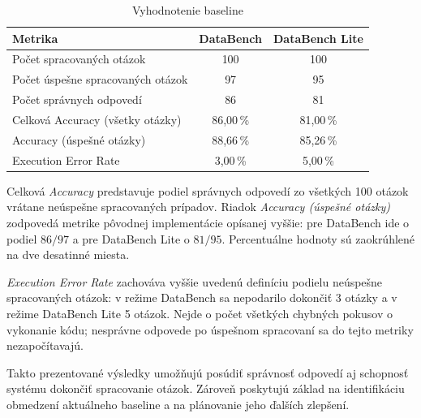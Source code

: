 \begin{table}[htbp]
    \centering
    \caption{Vyhodnotenie baseline}
    \label{tab:baseline-metriky}
    \begin{tabular}{|l|c|c|}
        \hline
        \textbf{Metrika} &
        \textbf{DataBench} &
        \textbf{DataBench Lite} \\
        \hline
        Počet spracovaných otázok & 100 & 100 \\
        \hline
        Počet úspešne spracovaných otázok & 97 & 95 \\
        \hline
        Počet správnych odpovedí & 86 & 81 \\
        \hline
        Celková Accuracy (všetky otázky) & 86,00\,\% & 81,00\,\% \\
        \hline
        Accuracy (úspešné otázky) & 88,66\,\% & 85,26\,\% \\
        \hline
        Execution Error Rate & 3,00\,\% & 5,00\,\% \\
        \hline
    \end{tabular}
\end{table}

Celková \textit{Accuracy} predstavuje podiel správnych odpovedí zo všetkých 100 otázok vrátane neúspešne spracovaných prípadov. Riadok \textit{Accuracy (úspešné otázky)} zodpovedá metrike pôvodnej implementácie opísanej vyššie: pre DataBench ide o podiel $86/97$ a pre DataBench Lite o $81/95$. Percentuálne hodnoty sú zaokrúhlené na dve desatinné miesta.

\textit{Execution Error Rate} zachováva vyššie uvedenú definíciu podielu neúspešne spracovaných otázok: v režime DataBench sa nepodarilo dokončiť 3 otázky a v režime DataBench Lite 5 otázok. Nejde o počet všetkých chybných pokusov o vykonanie kódu; nesprávne odpovede po úspešnom spracovaní sa do tejto metriky nezapočítavajú.

Takto prezentované výsledky umožňujú posúdiť správnosť odpovedí aj schopnosť systému dokončiť spracovanie otázok. Zároveň poskytujú základ na identifikáciu obmedzení aktuálneho baseline a na plánovanie jeho ďalších zlepšení.
